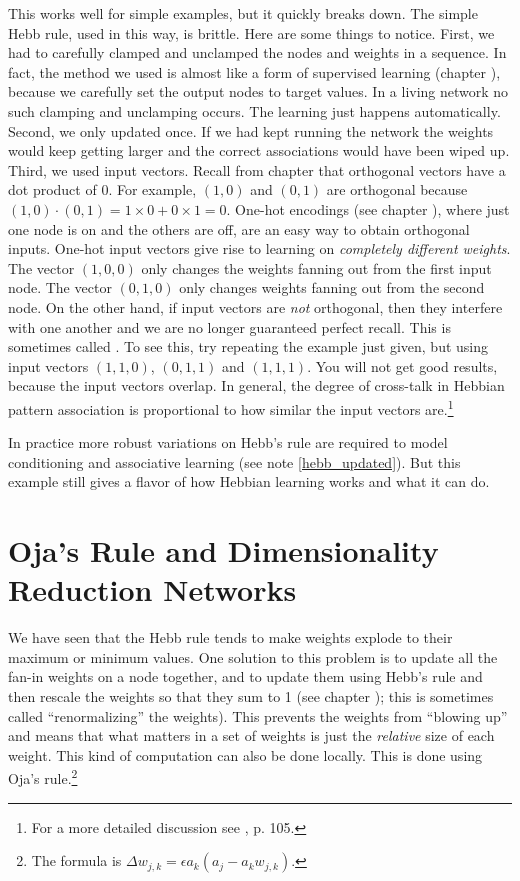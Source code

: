 This works well for simple examples, but it quickly breaks down. The simple Hebb rule, used in this way, is brittle. Here  are some things to notice. First, we had to carefully clamped and unclamped the nodes and weights in a sequence. In fact, the method we used is almost like a form of supervised learning (chapter ), because we carefully set the output nodes to target values. In a living network no such clamping and unclamping occurs. The learning just happens automatically. Second, we only updated once. If we had kept running the network the weights would keep getting larger and the correct associations would have been wiped up. Third, we used  input vectors. Recall from chapter  that orthogonal vectors have a dot product of 0. For example, $(1,0)$ and $(0,1)$ are orthogonal because $(1,0) \cdot (0,1) = 1 \times 0 + 0 \times 1 = 0$. One-hot encodings (see chapter ), where just one node is on and the others are off, are an easy way to obtain orthogonal inputs. One-hot input vectors give rise to learning on \emph{completely different weights}. The vector $(1,0,0)$ only changes the weights fanning out from the first input node. The  vector $(0,1,0)$ only changes weights fanning out from the second node. On the other hand, if input vectors are {\em not} orthogonal, then they interfere with one another and we are no longer guaranteed perfect recall. This is sometimes called . To see this, try repeating the example just given, but using input vectors $(1,1,0)$, $(0,1,1)$ and $(1,1,1)$. You will not get good results, because the input vectors overlap. In general, the degree of cross-talk in Hebbian pattern association  is proportional to how similar the input vectors are.\footnote{For a more detailed discussion see \cite{fausett1994fundamentals}, p. 105.}

In practice more robust variations on Hebb's rule are required to model conditioning and associative learning (see note \ref{hebb_updated}). But this example still gives a flavor of how Hebbian learning works and what it can do.

\section{Oja's Rule and Dimensionality Reduction Networks}


We have seen that the Hebb rule tends to make weights explode to their maximum or minimum values. One solution to this problem is to update all the fan-in weights on a node together, and to update them using Hebb's rule and then rescale the weights so that they sum to 1 (see chapter ); this is sometimes called ``renormalizing'' the weights). This prevents the weights from ``blowing up'' and means that what matters in a set of weights is just the \emph{relative} size of each weight. This kind of computation can also be done locally. This is done using Oja's rule.\footnote{The formula is $\Delta w_{j,k} = \epsilon a_k (a_j - a_k  w_{j,k})$.}

